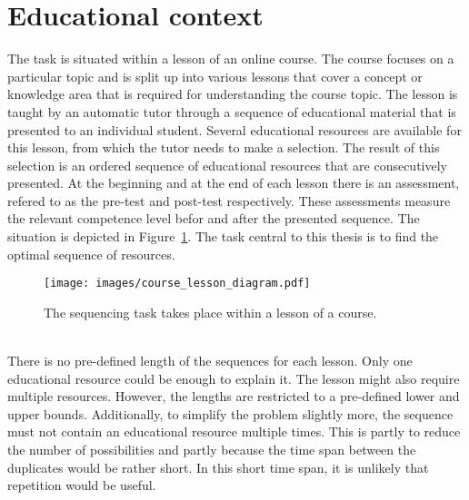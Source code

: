 \section{Educational context}
\label{sec:task_context}
The task is situated within a lesson of an online course. The course
focuses on a particular topic and is split up into various lessons that cover a
concept or knowledge area that is required for understanding the
course topic. The lesson is taught by an automatic tutor through a sequence of
educational material that is presented to an individual student. Several
educational resources are available for this lesson, from which the tutor needs
to make a selection. The result of this selection is an ordered sequence of
educational resources that are consecutively presented. At the beginning and at
the end of each lesson there is an assessment, refered to as the pre-test and
post-test respectively. These assessments measure the relevant competence level
befor and after the presented sequence. The situation is depicted in
Figure~\ref{fig:course_lesson_diagram}. The task central to this thesis is to
find the optimal sequence of resources.\\
\begin{figure}[ht]
	\centering
	\texttt{[image: images/course\_lesson\_diagram.pdf]}
	\caption[Educational context of the task]{The sequencing task takes place
	within a lesson of a course.}
	\label{fig:course_lesson_diagram}
\end{figure}\\
\noindent
There is no pre-defined length of the sequences for each lesson. Only one
educational resource could be enough to explain it. The lesson might also
require multiple resources. However, the lengths are restricted to a
pre-defined lower and upper bounds. Additionally, to simplify the problem
slightly more, the sequence must not contain an educational resource multiple
times. This is partly to reduce the number of possibilities and partly because
the time span between the duplicates would be rather short. In this short time
span, it is unlikely that repetition would be useful.
